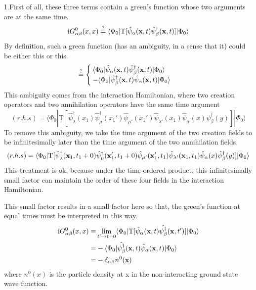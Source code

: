 1.First of all, these three terms contain a green's function whose two arguments are at the same time.
\begin{align}
\mathrm{i}G^0_{\alpha\beta}(x,x)\stackrel{?}{=}\langle\Phi_0|\mathrm{T}[\hat \psi_{\alpha}({\bf x},t)\hat \psi_{\beta}^{\dagger}({\bf x},t)]|\Phi_0\rangle \nonumber
\end{align}
By definition, such a green function (has an ambiguity, in a sense that it) could be either this or this.
\begin{align}
\stackrel{?}{=}
\begin{cases}
\langle\Phi_0|\hat \psi_{\alpha}({\bf x},t)\hat \psi_{\beta}^{\dagger}({\bf x},t)|\Phi_0\rangle  \cr -\langle\Phi_0|\hat \psi_{\beta}^{\dagger}({\bf x},t)\hat \psi_{\alpha}({\bf x},t)|\Phi_0\rangle
\end{cases}
\nonumber
\end{align}
This ambiguity comes from the interaction Hamiltonian, where two creation operators and two annihilation operators have the same time argument
$$(r.h.s)=\langle\Phi_0|\mathrm{T}[\hat \psi_{\lambda}^{\dagger}(x_1)\hat \psi_{\mu}^{\dagger}(x_1')\hat \psi_{\mu'}(x_1')\hat \psi_{\lambda'}(x_1)\hat \psi_{\alpha}(x)\psi^{\dagger}_{\beta}(y)]|\Phi_0\rangle $$
To remove this ambiguity, we take the time argument of the two creation fields to be infinitesimally later than the time argument of the two annihilation fields.
$$(r.h.s)=\langle \Phi_0|\mathrm{T}[\hat \psi_{\lambda}^{\dagger}({\bf x}_1,t_1+0)\hat \psi_{\mu}^{\dagger}({\bf x}_1',t_1+0)\hat \psi_{\mu'}({\bf x}_1',t_1)\hat \psi_{\lambda'}({\bf x}_1,t_1)\hat \psi_{\alpha}(x)\hat \psi^{\dagger}_{\beta}(y)]|\Phi_0\rangle$$
This treatment is ok, because under the time-ordered product, this infinitesimally small factor can maintain the order of these four fields in the interaction Hamiltonian.

This small factor results in a small factor here so that, the green's function at equal times must be interpreted in this way.
\begin{align}
\mathrm{i}G_{\alpha\beta}^{0}(x,x)\equiv& \lim_{t'\rightarrow t+0} \langle \Phi_0 | \mathrm{T}[\hat\psi_{\alpha}({\bf x},t)\hat{\psi_{\beta}^{\dagger}}({\bf x},t')]|\Phi_0\rangle \nonumber \\
=&-\langle \Phi_0 |\hat{\psi_{\beta}^{\dagger}}({\bf x},t)\hat\psi_{\alpha}({\bf x},t)|\Phi_0\rangle \nonumber \\
=&-\delta_{\alpha\beta}n^0({\bf x}) \nonumber
\end{align}
where $n^0(x) $ is the particle density at x in the non-interacting ground state wave function.

